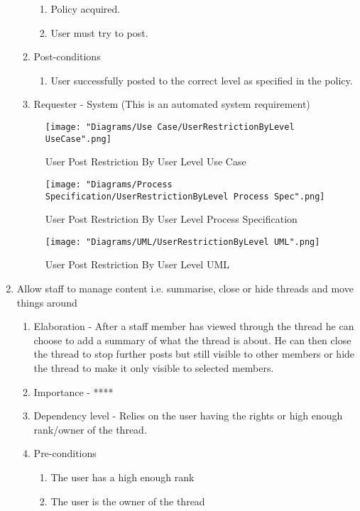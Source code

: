 \documentclass[12pt]{article}
\begin{document}
\begin{enumerate}
\begin{enumerate}
\begin{enumerate}
    	\item Policy acquired.
    	\item User must try to post.
    \end{enumerate}
        \item Post-conditions
    \begin{enumerate}
    	\item User successfully posted to the correct level as specified in the policy.
    \end{enumerate}
    \item Requester - System (This is an automated system requirement)
  \end{enumerate}
\begin{figure}[h]
	\centering
	\texttt{[image: "Diagrams/Use Case/UserRestrictionByLevel UseCase".png]}
	\caption{User Post Restriction By User Level Use Case}
\end{figure}
\begin{figure}[h]
	\centering
	\texttt{[image: "Diagrams/Process Specification/UserRestrictionByLevel Process Spec".png]}
	\caption{User Post Restriction By User Level Process Specification}
\end{figure}
\begin{figure}[h]
	\centering
	\texttt{[image: "Diagrams/UML/UserRestrictionByLevel UML".png]}
	\caption{User Post Restriction By User Level UML}
\end{figure}
\clearpage %
   \item  Allow staff to manage content i.e. summarise, close or hide threads and move things around%
  \begin{enumerate}
    \item Elaboration - After a staff member has viewed through the thread he can choose to add a summary of what the thread is about. He can then close the thread to stop further posts but still visible to other members or hide the thread to make it only visible to selected members.
    \item Importance - ****
    \item Dependency level - Relies on the user having the rights or high enough rank/owner of the thread.
    \item Pre-conditions
    \begin{enumerate}
    	\item The user has a high enough rank
    	\item The user is the owner of the thread

\end{enumerate}
\end{enumerate}
\end{enumerate}
\end{document}
